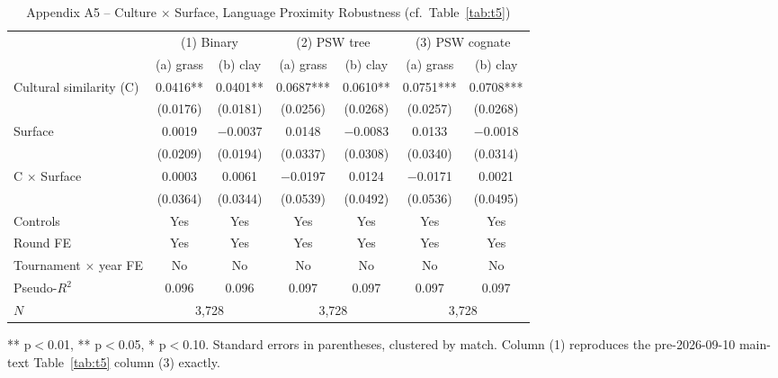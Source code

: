 \documentclass[10pt]{article}
\begin{document}
\begin{table}[htbp]
\centering
\caption{Appendix A5 -- Culture $\times$ Surface, Language Proximity Robustness (cf.\ Table~\ref{tab:t5}) \label{tab:a5}}
\begin{threeparttable}
\begin{tabular}{lcccccc}
\toprule
 & \multicolumn{2}{c}{(1) Binary} & \multicolumn{2}{c}{(2) PSW tree} & \multicolumn{2}{c}{(3) PSW cognate} \\
 & (a) grass & (b) clay & (a) grass & (b) clay & (a) grass & (b) clay \\
\midrule
Cultural similarity (C) & 0.0416** & 0.0401** & 0.0687*** & 0.0610** & 0.0751*** & 0.0708*** \\
 & (0.0176) & (0.0181) & (0.0256) & (0.0268) & (0.0257) & (0.0268) \\
Surface & 0.0019 & $-$0.0037 & 0.0148 & $-$0.0083 & 0.0133 & $-$0.0018 \\
 & (0.0209) & (0.0194) & (0.0337) & (0.0308) & (0.0340) & (0.0314) \\
C $\times$ Surface & 0.0003 & 0.0061 & $-$0.0197 & 0.0124 & $-$0.0171 & 0.0021 \\
 & (0.0364) & (0.0344) & (0.0539) & (0.0492) & (0.0536) & (0.0495) \\
\midrule
Controls  & Yes & Yes & Yes & Yes & Yes & Yes \\
Round FE & Yes & Yes & Yes & Yes & Yes & Yes \\
Tournament $\times$ year FE & No & No & No & No & No & No \\
Pseudo-$R^2$ & 0.096 & 0.096 & 0.097 & 0.097 & 0.097 & 0.097 \\
$N$ & \multicolumn{2}{c}{3,728} & \multicolumn{2}{c}{3,728} & \multicolumn{2}{c}{3,728} \\
\bottomrule
\end{tabular}
\begin{tablenotes}
\small
\item *** p$<$0.01, ** p$<$0.05, * p$<$0.10. Standard errors in parentheses, clustered by match. Column (1) reproduces the pre-2026-09-10 main-text Table~\ref{tab:t5} column (3) exactly.
\end{tablenotes}
\end{threeparttable}
\end{table}
\end{document}

